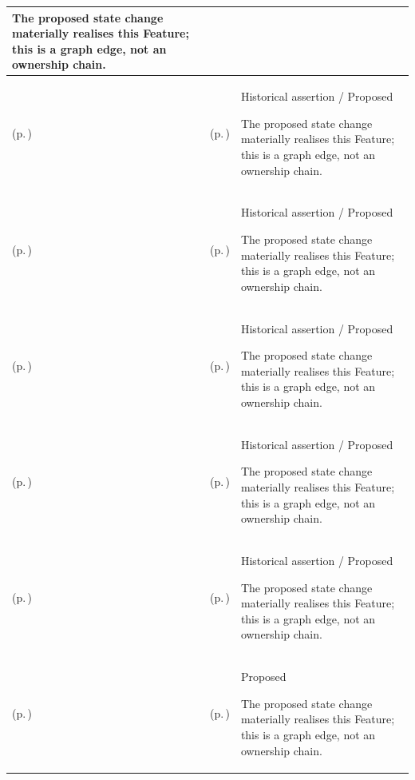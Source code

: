 \begin{longtable}{|>{\raggedright\arraybackslash}p{0.27\TableWidth}|>{\raggedright\arraybackslash}p{0.27\TableWidth}|>{\raggedright\arraybackslash}p{0.46\TableWidth}|}
The proposed state change materially realises this Feature; this is a graph edge, not an ownership chain.\\\hline
\nameref{function:maintain-operational-fulfilment-definition} (p.\,\pageref{function:maintain-operational-fulfilment-definition}) & \nameref{feature:operational-activity-context-definition} (p.\,\pageref{feature:operational-activity-context-definition}) & Historical assertion / Proposed

The proposed state change materially realises this Feature; this is a graph edge, not an ownership chain.\\\hline
\nameref{function:establish-activity-effect-observation-basis} (p.\,\pageref{function:establish-activity-effect-observation-basis}) & \nameref{feature:uncertain-activity-outcome-reconciliation} (p.\,\pageref{feature:uncertain-activity-outcome-reconciliation}) & Historical assertion / Proposed

The proposed state change materially realises this Feature; this is a graph edge, not an ownership chain.\\\hline
\nameref{function:reconcile-indeterminate-activity-effects} (p.\,\pageref{function:reconcile-indeterminate-activity-effects}) & \nameref{feature:uncertain-activity-outcome-reconciliation} (p.\,\pageref{feature:uncertain-activity-outcome-reconciliation}) & Historical assertion / Proposed

The proposed state change materially realises this Feature; this is a graph edge, not an ownership chain.\\\hline
\nameref{function:determine-reconciled-activity-continuation} (p.\,\pageref{function:determine-reconciled-activity-continuation}) & \nameref{feature:uncertain-activity-outcome-reconciliation} (p.\,\pageref{feature:uncertain-activity-outcome-reconciliation}) & Historical assertion / Proposed

The proposed state change materially realises this Feature; this is a graph edge, not an ownership chain.\\\hline
\nameref{function:assess-service-offering-readiness} (p.\,\pageref{function:assess-service-offering-readiness}) & \nameref{feature:service-readiness-dependency-assessment} (p.\,\pageref{feature:service-readiness-dependency-assessment}) & Historical assertion / Proposed

The proposed state change materially realises this Feature; this is a graph edge, not an ownership chain.\\\hline
\nameref{function:assemble-purpose-qualified-research-release} (p.\,\pageref{function:assemble-purpose-qualified-research-release}) & \nameref{feature:authorised-research-release-assembly} (p.\,\pageref{feature:authorised-research-release-assembly}) & Proposed

The proposed state change materially realises this Feature; this is a graph edge, not an ownership chain.\\\hline
\end{longtable}\endgroup
